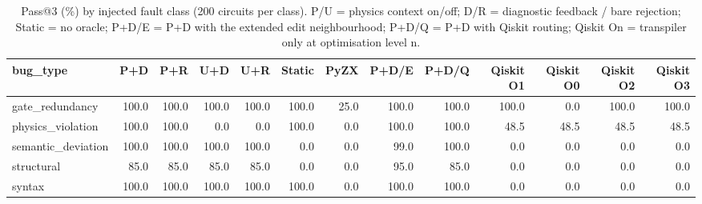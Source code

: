\begin{table}[t]
\centering
\caption{Pass@3 (\%) by injected fault class (200 circuits per class). P/U = physics context on/off; D/R = diagnostic feedback / bare rejection; Static = no oracle; P+D/E = P+D with the extended edit neighbourhood; P+D/Q = P+D with Qiskit routing; Qiskit On = transpiler only at optimisation level n.}
\label{tab:class}
\footnotesize
\setlength{\tabcolsep}{3pt}
\begin{tabular}{lrrrrrrrrrrrr}
\toprule
bug\_type & P+D & P+R & U+D & U+R & Static & PyZX & P+D/E & P+D/Q & Qiskit O1 & Qiskit O0 & Qiskit O2 & Qiskit O3 \\
\midrule
gate\_redundancy & 100.0 & 100.0 & 100.0 & 100.0 & 100.0 & 25.0 & 100.0 & 100.0 & 100.0 & 0.0 & 100.0 & 100.0 \\
physics\_violation & 100.0 & 100.0 & 0.0 & 0.0 & 100.0 & 0.0 & 100.0 & 100.0 & 48.5 & 48.5 & 48.5 & 48.5 \\
semantic\_deviation & 100.0 & 100.0 & 100.0 & 100.0 & 0.0 & 0.0 & 99.0 & 100.0 & 0.0 & 0.0 & 0.0 & 0.0 \\
structural & 85.0 & 85.0 & 85.0 & 85.0 & 0.0 & 0.0 & 95.0 & 85.0 & 0.0 & 0.0 & 0.0 & 0.0 \\
syntax & 100.0 & 100.0 & 100.0 & 100.0 & 100.0 & 0.0 & 100.0 & 100.0 & 0.0 & 0.0 & 0.0 & 0.0 \\
\bottomrule
\end{tabular}
\end{table}
